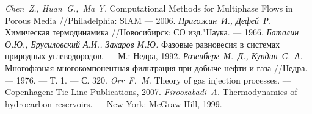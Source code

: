 \documentclass[12pt]{article}
\begin{document}
\begin{thebibliography}{9}
     {\em Chen~Z., Huan~G.,~Ma Y.} Computational Methods for Multiphase Flows in Porous Media //Philadelphia: SIAM --- 2006.
     {\em Пригожин~И., Дефей~Р.} Химическая термодинамика //Новосибирск: СО изд."Наука. --- 1966.
     {\em  Баталин О.Ю., Брусиловский А.И., Захаров М.Ю.} Фазовые равновесия в системах природных углеводородов. --- М.: Недра, 1992.
     {\em Розенберг~М.~Д., Кундин~С.~А.} Многофазная многокомпонентная фильтрация при добыче нефти и газа //Недра. --– 1976. --– Т. 1. --– С. 320.
     {\em Orr~F.~M.} Theory of gas injection processes. --– Copenhagen: Tie-Line Publications, 2007.
     {\em Firoozabadi~A.} Thermodynamics of hydrocarbon reservoirs. --– New York: McGraw-Hill, 1999.
\end{thebibliography}
\end{document}
